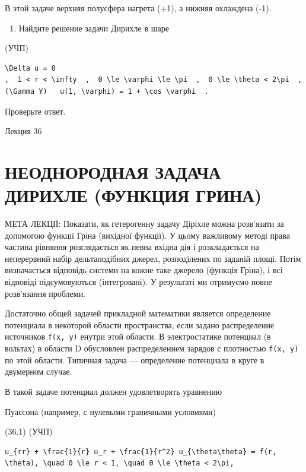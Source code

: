 \documentclass[
  ukrainian,
]{article}
\providecommand{\tightlist}{%
  \setlength{\itemsep}{0pt}\setlength{\parskip}{0pt}}
\begin{document}
В этой задаче верхняя полусфера нагрета (+1), а нижняя охлаждена (-1).

\begin{enumerate}
\def\labelenumi{\arabic{enumi}.}
\setcounter{enumi}{5}
\tightlist
\item
  Найдите решение задачи Дирихле в шаре
\end{enumerate}

(УЧП)

\begin{verbatim}
\Delta u = 0
,  1 < r < \infty  ,  0 \le \varphi \le \pi  ,  0 \le \theta < 2\pi  ,  (\Gamma Y)   u(1, \varphi) = 1 + \cos \varphi  .
\end{verbatim}

Проверьте ответ.

Лекция 36

\section{НЕОДНОРОДНАЯ ЗАДАЧА ДИРИХЛЕ (ФУНКЦИЯ
ГРИНА)}\label{ux43dux435ux43eux434ux43dux43eux440ux43eux434ux43dux430ux44f-ux437ux430ux434ux430ux447ux430-ux434ux438ux440ux438ux445ux43bux435-ux444ux443ux43dux43aux446ux438ux44f-ux433ux440ux438ux43dux430}

МЕТА ЛЕКЦІЇ: Показати, як гетерогенну задачу Діріхле можна розв'язати за
допомогою функції Гріна (вихідної функції). У цьому важливому методі
права частина рівняння розглядається як певна вхідна дія і розкладається
на неперервний набір дельтаподібних джерел, розподілених по заданій
площі. Потім визначається відповідь системи на кожне таке джерело
(функція Гріна), і всі відповіді підсумовуються (інтегровані). У
результаті ми отримуємо повне розв'язання проблеми.

Достаточно общей задачей прикладной математики является определение
потенциала в некоторой области пространства, если задано распределение
источников \texttt{f(x,\ y)} енутри этой области. В электростатике
потенциал (в вольтах) в области D обусловлен распределением зарядов с
плотностью \texttt{f(x,\ y)} по этой области. Типичная задача ---
определение потенциала в круге в двумерном случае.

В такой задаче потенциал должен удовлетворять уравнению

Пуассона (например, с нулевыми граничными условиями)

(36.1) (УЧП)

\begin{verbatim}
u_{rr} + \frac{1}{r} u_r + \frac{1}{r^2} u_{\theta\theta} = f(r, \theta), \quad 0 \le r < 1, \quad 0 \le \theta < 2\pi,
\end{verbatim}
\end{document}

